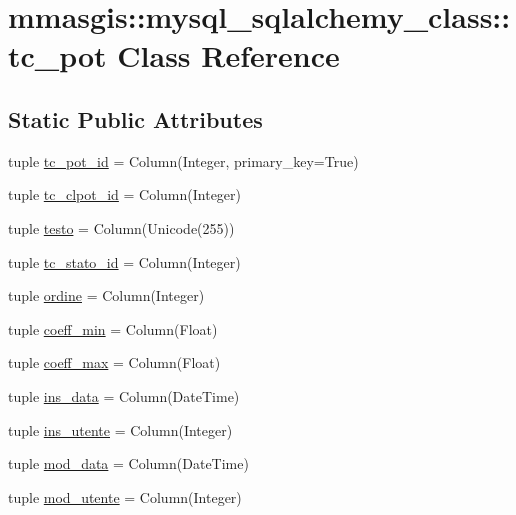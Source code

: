 \hypertarget{classmmasgis_1_1mysql__sqlalchemy__class_1_1tc__pot}{
\section{mmasgis::mysql\_\-sqlalchemy\_\-class::tc\_\-pot Class Reference}
\label{classmmasgis_1_1mysql__sqlalchemy__class_1_1tc__pot}
}
\subsection*{Static Public Attributes}
\begin{DoxyCompactItemize}
\item 
tuple \hyperlink{classmmasgis_1_1mysql__sqlalchemy__class_1_1tc__pot_a97da353180cf4f6b3fc78cb86f3d0789}{tc\_\-pot\_\-id} = Column(Integer, primary\_\-key=True)
\item 
tuple \hyperlink{classmmasgis_1_1mysql__sqlalchemy__class_1_1tc__pot_a37ce5423b68c5decf070cb68259e2cd8}{tc\_\-clpot\_\-id} = Column(Integer)
\item 
tuple \hyperlink{classmmasgis_1_1mysql__sqlalchemy__class_1_1tc__pot_a3e31f23bf11ba8560fddfaa90d766e5c}{testo} = Column(Unicode(255))
\item 
tuple \hyperlink{classmmasgis_1_1mysql__sqlalchemy__class_1_1tc__pot_a294454e7001bafd8656adb716d493876}{tc\_\-stato\_\-id} = Column(Integer)
\item 
tuple \hyperlink{classmmasgis_1_1mysql__sqlalchemy__class_1_1tc__pot_aeb33ea3da55f85c130f240767f3b59dc}{ordine} = Column(Integer)
\item 
tuple \hyperlink{classmmasgis_1_1mysql__sqlalchemy__class_1_1tc__pot_a34a74ac95554c977e361dd5bb85836b5}{coeff\_\-min} = Column(Float)
\item 
tuple \hyperlink{classmmasgis_1_1mysql__sqlalchemy__class_1_1tc__pot_a2c6ec5710e8ea2df46a43e27f1313c34}{coeff\_\-max} = Column(Float)
\item 
tuple \hyperlink{classmmasgis_1_1mysql__sqlalchemy__class_1_1tc__pot_a95bd4a5a624f18ef2ec8d089d1599103}{ins\_\-data} = Column(DateTime)
\item 
tuple \hyperlink{classmmasgis_1_1mysql__sqlalchemy__class_1_1tc__pot_a166b4667d8b70fa174f485830715aa4d}{ins\_\-utente} = Column(Integer)
\item 
tuple \hyperlink{classmmasgis_1_1mysql__sqlalchemy__class_1_1tc__pot_add28d5e9e141b317e246253fa23443b3}{mod\_\-data} = Column(DateTime)
\item 
tuple \hyperlink{classmmasgis_1_1mysql__sqlalchemy__class_1_1tc__pot_a5156b36c27a194f6372a9043cc266846}{mod\_\-utente} = Column(Integer)
\end{DoxyCompactItemize}
